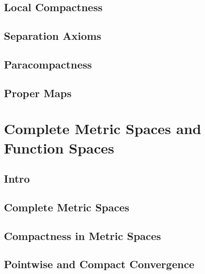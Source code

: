 \subsection{Local Compactness}
\label{subsection-local-compactness}

\subsection{Separation Axioms}
\label{subsection-separation-axioms}

\subsection{Paracompactness}
\label{subsection-paracompactness}

\subsection{Proper Maps}


\section{Complete Metric Spaces and Function Spaces}
\label{section-complete-metric-spaces-and-function-spaces}

\subsection{Intro}
\label{subsection-complete-metric-spaces-and-function-spaces-intro}

\subsection{Complete Metric Spaces}
\label{subsection-complete-metric-spaces}

\subsection{Compactness in Metric Spaces}
\label{subsection-compactness-in-metric-spaces}

\subsection{Pointwise and Compact Convergence}
\label{subsection-pointwise-and-compact-convergence}

